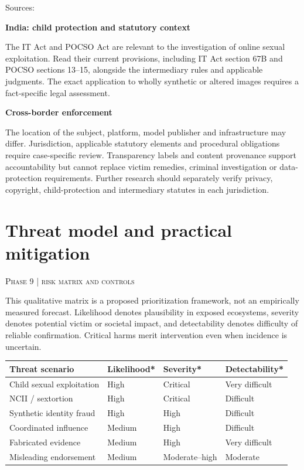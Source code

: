 \documentclass[11pt,a4paper]{article}
\newcommand{\sect}[2]{\section{#1}\textcolor{muted}{\small\textsc{#2}}\par\vspace{2mm}}
\newcommand{\sub}[1]{\vspace{1mm}\textbf{#1}\par}
\begin{document}
Sources:  \cite{india,indiafaq,eu,eudate,us,uk,ukcps,au,ca,jp,kr,itact,pocso}


\sub{India: child protection and statutory context}

The IT Act and POCSO Act are relevant to the investigation of online sexual exploitation. Read their current provisions, including IT Act section 67B and POCSO sections 13--15, alongside the intermediary rules and applicable judgments. The exact application to wholly synthetic or altered images requires a fact-specific legal assessment. \cite{itact,pocso}


\sub{Cross-border enforcement}

The location of the subject, platform, model publisher and infrastructure may differ. Jurisdiction, applicable statutory elements and procedural obligations require case-specific review. Transparency labels and content provenance support accountability but cannot replace victim remedies, criminal investigation or data-protection requirements. Further research should separately verify privacy, copyright, child-protection and intermediary statutes in each jurisdiction.


\clearpage\sect{Threat model and practical mitigation}{Phase 9 | risk matrix and controls}

This qualitative matrix is a proposed prioritization framework, not an empirically measured forecast. Likelihood denotes plausibility in exposed ecosystems, severity denotes potential victim or societal impact, and detectability denotes difficulty of reliable confirmation. Critical harms merit intervention even when incidence is uncertain.


\begin{center}\small\begin{tabularx}{\linewidth}{@{}YYYY@{}}\toprule
\textbf{Threat scenario} & \textbf{Likelihood*} & \textbf{Severity*} & \textbf{Detectability*}\\\midrule
Child sexual exploitation & High & Critical & Very difficult\\
NCII / sextortion & High & Critical & Difficult\\
Synthetic identity fraud & High & High & Difficult\\
Coordinated influence & Medium & High & Difficult\\
Fabricated evidence & Medium & High & Very difficult\\
Misleading endorsement & Medium & Moderate--high & Moderate\\\bottomrule\end{tabularx}\end{center}
\end{document}
